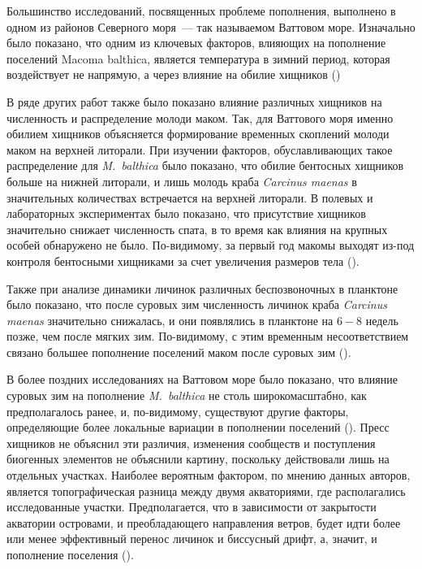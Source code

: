 Большинство исследований, посвященных проблеме пополнения, выполнено в одном из районов Северного моря~--- так называемом Ваттовом море.	
Изначально было показано, что одним из ключевых факторов, влияющих на пополнение поселений Macoma balthica, является температура в зимний период, которая воздействует не напрямую, а через влияние на обилие хищников (\cite{Beukema_et_al_1998, Beukema_Dekker_2014, Dekker_Beukema_2014})

В ряде других работ также было показано влияние различных хищников на численность и распределение молоди маком. 
Так, для Ваттового моря именно обилием хищников объясняется формирование временных скоплений молоди маком на верхней литорали. 
При изучении факторов, обуславливающих такое распределение для \textit{M.~balthica} было показано, что обилие бентосных хищников больше на нижней литорали, и лишь молодь краба \textit{Carcinus maenas} в значительных количествах встречается на верхней литорали. 
В полевых и лабораторных экспериментах было показано, что присутствие хищников значительно снижает численность спата, в то время как влияния на крупных особей обнаружено не было. 
По-видимому, за первый год макомы выходят из-под контроля бентосными хищниками за счет увеличения размеров тела (\cite{Hiddink_et_al_2002_predation_epifauna}). 

Также при анализе динамики личинок различных беспозвоночных в планктоне было показано, что после суровых зим численность личинок краба \textit{Carcinus maenas} значительно снижалась, и они появлялись в планктоне на $6-8$ недель позже, чем после мягких зим. 
По-видимому, с этим временным несоответствием связано большее пополнение поселений маком после суровых зим (\cite{Strasser_Gunter_2001}).

В более поздних исследованиях на Ваттовом море было показано, что влияние суровых зим на пополнение \textit{M.~balthica} не столь широкомасштабно, как предполагалось ранее, и, по-видимому, существуют другие факторы, определяющие более локальные вариации в пополнении поселений (\cite{Strasser_et_al_2003, Flatch_2003}).
Пресс хищников не объяснил эти различия, изменения сообществ и поступления биогенных элементов не объяснили картину, поскольку действовали лишь на отдельных участках. 
Наиболее вероятным фактором, по мнению данных авторов, является топографическая разница между двумя акваториями, где располагались исследованные участки. 
Предполагается, что в зависимости от закрытости акватории островами, и преобладающего направления ветров, будет идти более или менее эффективный перенос личинок и биссусный дрифт, а, значит, и пополнение поселения (\cite{Strasser_et_al_2003}).

